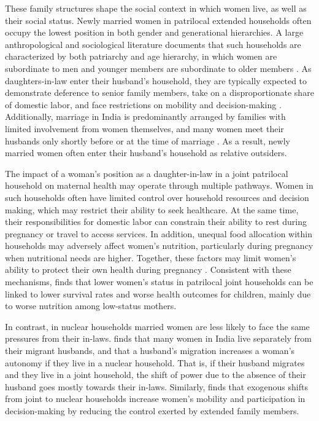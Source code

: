 \documentclass[12pt]{article}
\begin{document}
These family structures shape the social context in which women live, as well as their social status. Newly married women in patrilocal extended households often occupy the lowest position in both gender and generational hierarchies. A large anthropological and sociological literature documents that such households are characterized by both patriarchy and age hierarchy, in which women are subordinate to men and younger members are subordinate to older members \citep{coffey2022mothers}. As daughters-in-law enter their husband’s household, they are typically expected to demonstrate deference to senior family members, take on a disproportionate share of domestic labor, and face restrictions on mobility and decision-making \citep{mandelbaum1988women, jeffery1989labour}. Additionally, marriage in India is predominantly arranged by families with limited involvement from women themselves, and many women meet their husbands only shortly before or at the time of marriage \citep{desai2010gender, banerji2021does}. As a result, newly married women often enter their husband’s household as relative outsiders.

The impact of a woman’s position as a daughter-in-law in a joint patrilocal household on maternal health may operate through multiple pathways. Women in such households often have limited control over household resources and decision making, which may restrict their ability to seek healthcare. At the same time, their responsibilities for domestic labor can constrain their ability to rest during pregnancy or travel to access services. In addition, unequal food allocation within households may adversely affect women’s nutrition, particularly during pregnancy when nutritional needs are higher. Together, these factors may limit women’s ability to protect their own health during pregnancy \citep{allendorf2013going}. Consistent with these mechanisms, \cite{coffey2022mothers} finds that lower women’s status in patrilocal joint households can be linked to lower survival rates and worse health outcomes for children, mainly due to worse nutrition among low-status mothers.

In contrast, in nuclear households married women are less likely to face the same pressures from their in-laws. \cite{desai2008negotiated} finds that many women in India live separately from their migrant husbands, and that a husband's migration increases a woman's autonomy if they live in a nuclear household. That is, if their husband migrates and they live in a joint household, the shift of power due to the absence of their husband goes mostly towards their in-laws. Similarly, \cite{mookerjee2019gender} finds that exogenous shifts from joint to nuclear households increase women’s mobility and participation in decision-making by reducing the control exerted by extended family members.
\end{document}
